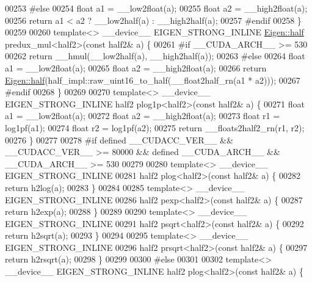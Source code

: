 \begin{DoxyCode}
00253 \textcolor{preprocessor}{#else}
00254   \textcolor{keywordtype}{float} a1 = \_\_low2float(a);
00255   \textcolor{keywordtype}{float} a2 = \_\_high2float(a);
00256   \textcolor{keywordflow}{return} a1 < a2 ? \_\_low2half(a) : \_\_high2half(a);
00257 \textcolor{preprocessor}{#endif}
00258 \}
00259 
00260 \textcolor{keyword}{template}<> \_\_device\_\_ EIGEN\_STRONG\_INLINE \hyperlink{struct_eigen_1_1half}{Eigen::half} predux\_mul<half2>(\textcolor{keyword}{const} half2& a) \{
00261 \textcolor{preprocessor}{#if \_\_CUDA\_ARCH\_\_ >= 530}
00262   \textcolor{keywordflow}{return} \_\_hmul(\_\_low2half(a), \_\_high2half(a));
00263 \textcolor{preprocessor}{#else}
00264   \textcolor{keywordtype}{float} a1 = \_\_low2float(a);
00265   \textcolor{keywordtype}{float} a2 = \_\_high2float(a);
00266   \textcolor{keywordflow}{return} \hyperlink{struct_eigen_1_1half}{Eigen::half}(half\_impl::raw\_uint16\_to\_half(\_\_float2half\_rn(a1 * a2)));
00267 \textcolor{preprocessor}{#endif}
00268 \}
00269 
00270 \textcolor{keyword}{template}<> \_\_device\_\_ EIGEN\_STRONG\_INLINE half2 plog1p<half2>(\textcolor{keyword}{const} half2& a) \{
00271   \textcolor{keywordtype}{float} a1 = \_\_low2float(a);
00272   \textcolor{keywordtype}{float} a2 = \_\_high2float(a);
00273   \textcolor{keywordtype}{float} r1 = log1pf(a1);
00274   \textcolor{keywordtype}{float} r2 = log1pf(a2);
00275   \textcolor{keywordflow}{return} \_\_floats2half2\_rn(r1, r2);
00276 \}
00277 
00278 \textcolor{preprocessor}{#if defined \_\_CUDACC\_VER\_\_ && \_\_CUDACC\_VER\_\_ >= 80000 && defined \_\_CUDA\_ARCH\_\_ && \_\_CUDA\_ARCH\_\_ >= 530}
00279 
00280 \textcolor{keyword}{template}<>  \_\_device\_\_ EIGEN\_STRONG\_INLINE
00281 half2 plog<half2>(\textcolor{keyword}{const} half2& a) \{
00282   \textcolor{keywordflow}{return} h2log(a);
00283 \}
00284 
00285 \textcolor{keyword}{template}<> \_\_device\_\_ EIGEN\_STRONG\_INLINE
00286 half2 pexp<half2>(\textcolor{keyword}{const} half2& a) \{
00287   \textcolor{keywordflow}{return} h2exp(a);
00288 \}
00289 
00290 \textcolor{keyword}{template}<> \_\_device\_\_ EIGEN\_STRONG\_INLINE
00291 half2 psqrt<half2>(\textcolor{keyword}{const} half2& a) \{
00292   \textcolor{keywordflow}{return} h2sqrt(a);
00293 \}
00294 
00295 \textcolor{keyword}{template}<> \_\_device\_\_ EIGEN\_STRONG\_INLINE
00296 half2 prsqrt<half2>(\textcolor{keyword}{const} half2& a) \{
00297   \textcolor{keywordflow}{return} h2rsqrt(a);
00298 \}
00299 
00300 \textcolor{preprocessor}{#else}
00301 
00302 \textcolor{keyword}{template}<> \_\_device\_\_ EIGEN\_STRONG\_INLINE half2 plog<half2>(\textcolor{keyword}{const} half2& a) \{

\end{DoxyCode}
